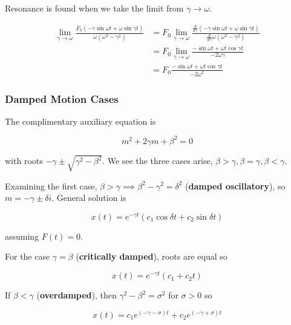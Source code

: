 Resonance is found when we take the limit from $\gamma\to \omega$.

\begin{align}
    \lim_{\gamma\to \omega}\frac{F_0(-\gamma \sin\omega t+\omega \sin\gamma t)}{\omega(\omega^2-\gamma^2)}&=F_0\lim_{\gamma\to\omega}\frac{\frac{d}{d\gamma}(-\gamma \sin\omega t+\omega \sin\gamma t)}{\frac{d}{d\gamma}\omega(\omega^2-\gamma^2)}\\
    &=F_0\lim_{\gamma\to \omega}\frac{-\sin\omega t+\omega t\cos \gamma t}{-2\omega\gamma}\\
    &=F_0\frac{-\sin\omega t+\omega t\cos\gamma t}{-2\omega^2}
\end{align}

\subsubsection{Damped Motion Cases}

The complimentary auxiliary equation is

\begin{equation}
    m^2+2\gamma m+\beta^2=0
\end{equation}

with roots $-\gamma \pm \sqrt{\gamma^2-\beta^2}$. We see the three cases arise,
$\beta > \gamma , \beta=\gamma,\beta <\gamma$.

Examining the first case, $\beta>\gamma\implies \beta^2-\gamma^2=\delta^2$ (\textbf{damped oscillatory}), so
$m=-\gamma \pm \delta i$. General solution is

\begin{equation}
    x(t)=e^{-\gamma t}(c_1\cos\delta t+c_2\sin\delta t)
\end{equation}

assuming $F(t)=0$.

For the case $\gamma = \beta$ (\textbf{critically damped}), roots are equal so

\begin{equation}
    x(t)=e^{-\gamma t}(c_1+c_2t)
\end{equation}

If $\beta<\gamma$ (\textbf{overdamped}), then $\gamma^2-\beta^2=\sigma^2$ for $\sigma>0$ so

\begin{equation}
    x(t)=c_1e^{(-\gamma-\sigma)t}+c_2e^{(-\gamma+\sigma)t}
\end{equation}

